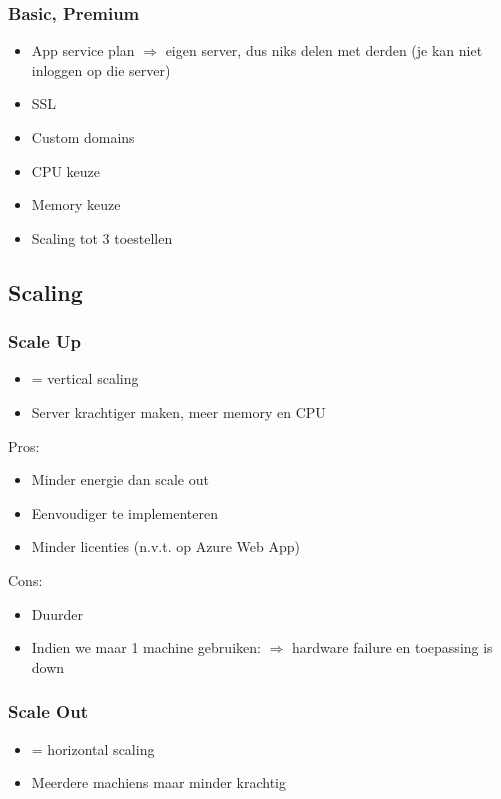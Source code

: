 \documentclass{article}
\begin{document}
\subsubsection{Basic, Premium}
\begin{itemize}
    \item App service plan $\Rightarrow$ eigen server, dus niks delen met derden (je kan niet inloggen op die server)
    \item SSL
    \item Custom domains
    \item CPU keuze
    \item Memory keuze
    \item Scaling tot 3 toestellen
\end{itemize}

\subsection{Scaling}

\subsubsection{Scale Up}
\begin{itemize}
    \item = vertical scaling
    \item Server krachtiger maken, meer memory en CPU
\end{itemize}

Pros: 
\begin{itemize}
    \item Minder energie dan scale out
    \item Eenvoudiger te implementeren
    \item Minder licenties (n.v.t. op Azure Web App)
\end{itemize}

Cons:

\begin{itemize}
    \item Duurder
    \item Indien we maar 1 machine gebruiken: $\Rightarrow$ hardware failure en toepassing is down
\end{itemize}


\subsubsection{Scale Out}
\begin{itemize}
    \item = horizontal scaling
    \item Meerdere machiens maar minder krachtig
\end{itemize}
\end{document}

